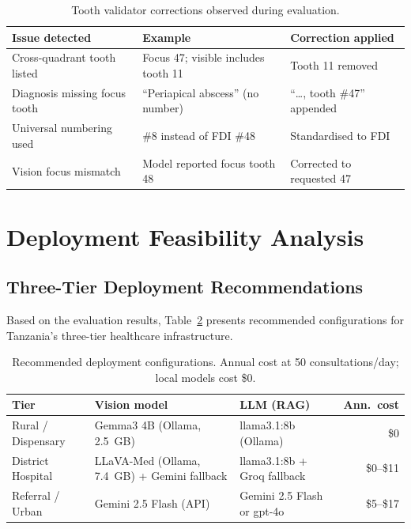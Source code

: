 \documentclass[12pt,a4paper]{report}
\begin{document}
	\begin{table}[H]
		\centering
		\caption{Tooth validator corrections observed during evaluation.}
		\label{tab:validator}
		\small
		\renewcommand{\arraystretch}{1.2}
		\begin{tabularx}{\textwidth}{@{}l X l@{}}
			\toprule
			\textbf{Issue detected} & \textbf{Example} & \textbf{Correction applied} \\
			\midrule
			Cross-quadrant tooth listed  & Focus 47; visible includes tooth 11 & Tooth 11 removed \\
			Diagnosis missing focus tooth & ``Periapical abscess'' (no number)  & ``\ldots, tooth \#47'' appended \\
			Universal numbering used     & \#8 instead of FDI \#48             & Standardised to FDI \\
			Vision focus mismatch        & Model reported focus tooth 48        & Corrected to requested 47 \\
			\bottomrule
		\end{tabularx}
	\end{table}
	
	\section{Deployment Feasibility Analysis}
	\label{sec:results_deployment}
	
	\subsection{Three-Tier Deployment Recommendations}
	
	Based on the evaluation results, Table~\ref{tab:deployment_recommendations}
	presents recommended configurations for Tanzania's three-tier healthcare
	infrastructure.
	
	\begin{table}[H]
		\centering
		\caption{Recommended deployment configurations.
			Annual cost at 50 consultations/day; local models cost \$0.}
		\label{tab:deployment_recommendations}
		\small
		\renewcommand{\arraystretch}{1.3}
		\begin{tabularx}{\textwidth}{@{}l X X r@{}}
			\toprule
			\textbf{Tier} & \textbf{Vision model} & \textbf{LLM (RAG)} & \textbf{Ann.\ cost} \\
			\midrule
			Rural / Dispensary  & Gemma3 4B (Ollama, 2.5~GB) & llama3.1:8b (Ollama) & \$0 \\
			District Hospital   & LLaVA-Med (Ollama, 7.4~GB) + Gemini fallback & llama3.1:8b + Groq fallback & \$0--\$11 \\
			Referral / Urban    & Gemini 2.5 Flash (API) & Gemini 2.5 Flash or gpt-4o & \$5--\$17 \\
			\bottomrule
		\end{tabularx}
	\end{table}
	
\end{document}
